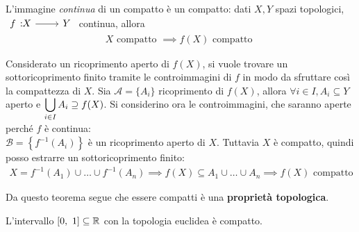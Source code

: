 \begin{theorema}\label{immagine compatto}
	L'immagine \textit{continua} di un compatto è un compatto: dati $X,Y$ spazi topologici, $\funz f X Y$ continua, allora
		\begin{gather*}
			X \text{ compatto } \implies f(X) \text{ compatto }
		\end{gather*}
	\vspace{-6mm}
\end{theorema}
\begin{demonstration}
	Considerato un ricoprimento aperto di $f(X)$, si vuole trovare un sottoricoprimento finito tramite le controimmagini di $f$ in modo da sfruttare così la compattezza di $X$. \newline
	Sia  $\mathcal{A}=\{A_i\}$ ricoprimento di $f(X)$, allora $\forall i\in I, A_i\subseteq Y$ aperto e $\displaystyle \mathop{{\bigcup}}\displaylimits_{i\in I}A_i \supseteq f(X)$. \newline
	Si considerino ora le controimmagini, che saranno aperte perché $f$ è continua:\\ $\mathcal{B}=\left\{f^{-1}(A_i)\right\}$ è un ricoprimento aperto di $X$. Tuttavia $X$ è compatto, quindi posso estrarre un sottoricoprimento finito:
		\begin{gather*}
			X=f^{-1}(A_1) \cup	\dots \cup f^{-1}(A_n) \implies f(X)\subseteq A_1\cup \dots \cup A_n \implies f(X) \text{ compatto}
		\end{gather*}
	\vspace{-6mm}
\end{demonstration}
Da questo teorema segue che essere compatti è una \textbf{proprietà topologica}.
\begin{theorema}
	L'intervallo $[0,\ 1]\subseteq\realset$ con la topologia euclidea è compatto.
\end{theorema}
